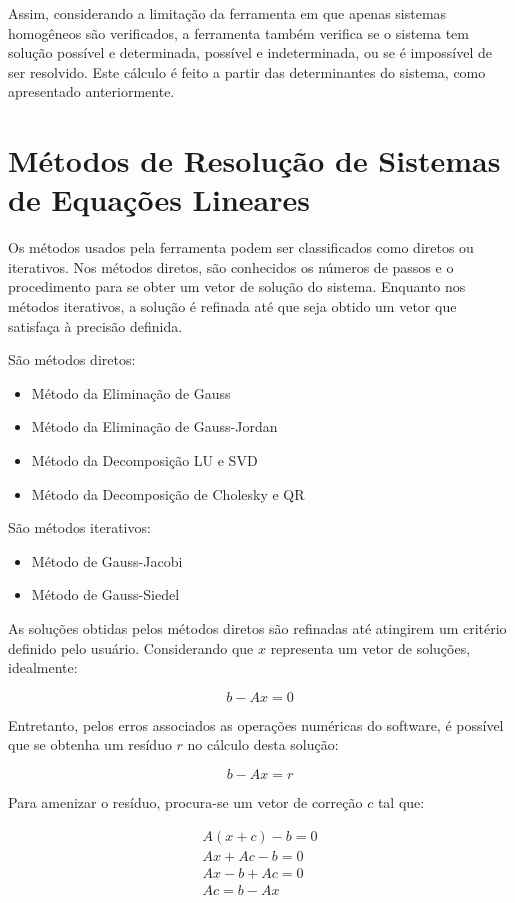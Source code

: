 \documentclass[a4paper,10pt]{report}
\begin{document}
Assim, considerando a limitação da ferramenta em que apenas sistemas homogêneos são verificados, a ferramenta também verifica se o sistema tem solução possível e determinada, possível e indeterminada, ou se é impossível de ser resolvido. Este cálculo é feito a partir das determinantes do sistema, como apresentado anteriormente.

\section{Métodos de Resolução de Sistemas de Equações Lineares}

Os métodos usados pela ferramenta podem ser classificados como diretos ou iterativos. Nos métodos diretos, são conhecidos os números de passos e o procedimento para se obter um vetor de solução do sistema. Enquanto nos métodos iterativos, a solução é refinada até que seja obtido um vetor que satisfaça à precisão definida.

São métodos diretos:
\begin{itemize}
 \item Método da Eliminação de Gauss
 \item Método da Eliminação de Gauss-Jordan
 \item Método da Decomposição LU e SVD
 \item Método da Decomposição de Cholesky e QR
\end{itemize}

São métodos iterativos:
\begin{itemize}
 \item Método de Gauss-Jacobi
 \item Método de Gauss-Siedel
\end{itemize}

As soluções obtidas pelos métodos diretos são refinadas até atingirem um critério definido pelo usuário. Considerando que $x$ representa um vetor de soluções, idealmente:

\[
b - Ax = 0
\]

Entretanto, pelos erros associados as operações numéricas do software, é possível que se obtenha um resíduo $r$ no cálculo desta solução:

\begin{equation}
b - Ax = r
\label{residuo}
\end{equation}

Para amenizar o resíduo, procura-se um vetor de correção $c$ tal que:

\[
\begin{array}{c}
A(x+c) - b = 0 \\
Ax + Ac - b = 0 \\
Ax - b + Ac = 0 \\
Ac = b - Ax \\
\end{array}
\]
\end{document}
